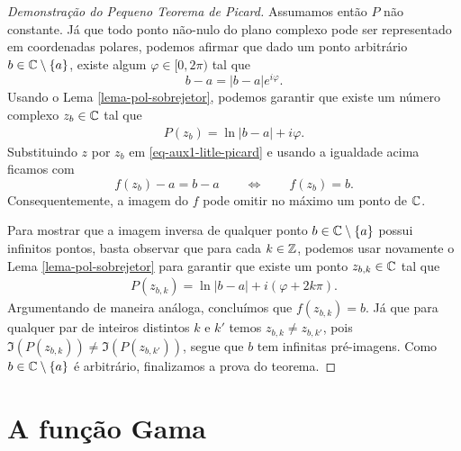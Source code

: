 \begin{proof}[Demonstração do Pequeno Teorema de Picard]
            Assumamos então $P$ não constante.
            Já que todo ponto não-nulo do plano complexo
            pode ser representado em coordenadas polares, podemos afirmar que dado um ponto arbitrário 
            $b\in \mathbb{C}\setminus\{a\}$,
            existe algum $\varphi \in [0, 2\pi)$ tal que
            \[
            b - a = |b - a| e^{i\varphi}.
            \]
            Usando o Lema \ref{lema-pol-sobrejetor},
            podemos garantir que existe um número complexo $z_b\in\mathbb{C}$ tal que
            \begin{align*}
                P(z_b) = \ln|b-a| + i\varphi.
            \end{align*}
            Substituindo $z$ por $z_b$ em
            \eqref{eq-aux1-litle-picard} e usando a igualdade acima ficamos com
            \[
            f(z_b) - a = b - a 
            \qquad \iff \qquad f(z_b) = b.
            \] 
            Consequentemente, a  
            imagem do $f$ pode omitir 
            no máximo um ponto de $\mathbb{C}$.
            
            Para mostrar que a imagem inversa de qualquer ponto 
            $b\in \mathbb{C}\setminus\{a\}$ possui infinitos pontos, basta 
            observar que para cada $k\in\mathbb{Z}$, podemos usar 
            novamente o Lema \ref{lema-pol-sobrejetor}
            para garantir que existe um ponto 
            $z_{b,k}\in \mathbb{C}$
            tal que 
            \begin{align*}
                P(z_{b,k}) = \ln|b-a| + i(\varphi+2k\pi).
            \end{align*}
            Argumentando de maneira análoga, 
            concluímos que 
            $f(z_{b,k})=b$. 
            Já que para qualquer par de inteiros distintos $k$ e $k'$
            temos $z_{b,k}\neq z_{b,k'}$, pois 
            $\Im(P(z_{b,k}))\neq \Im(P(z_{b,k'}))$, 
            segue que $b$ tem infinitas pré-imagens. 
            Como $b\in \mathbb{C}\setminus\{a\}$
            é arbitrário, finalizamos a prova do teorema.
        \end{proof}
        
        
        
\section{A função Gama}


